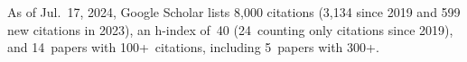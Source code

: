 %
As of Jul.~17, 2024, Google Scholar lists
8,000 citations (3,134 since 2019 and 599 new citations in 2023),
an h-index of~40 (24~counting only citations since 2019),
and 14~papers with 100+~citations, including 5~papers with 300+.
